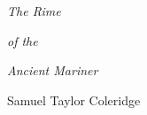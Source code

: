 \documentclass[12pt]{book}
\begin{document}
\thispagestyle{empty}

\begin{center}
\vspace*{2.5in}

{\Huge\itshape The Rime}

\vspace{0.3in}

{\Huge\itshape of the}

\vspace{0.3in}

{\Huge\itshape Ancient Mariner}

\vspace{1.2in}

{\Large Samuel Taylor Coleridge}

\end{center}

\clearpage
\end{document}
